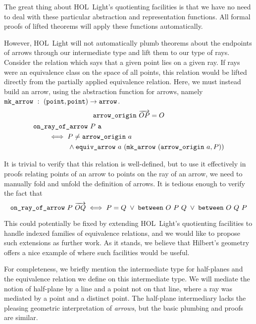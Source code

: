 The great thing about HOL~Light's quotienting facilities is that we have no need to deal with these particular abstraction and representation functions. All formal proofs of lifted theorems will apply these functions automatically. 

However, HOL~Light will not automatically plumb theorems about the endpoints of arrows through our intermediate type and lift them to our type of rays. Consider the relation which says that a given point lies on a given ray. If rays were an equivalence class on the space of all points, this relation would be lifted directly from the partially applied equivalence relation. Here, we must instead build an arrow, using the abstraction function for arrows, namely $\code{mk\_arrow}\ :\ (\code{point},\code{point})\rightarrow\code{arrow}$.
\begin{gather}
  \code{arrow\_origin}\ \overrightarrow{OP} = O\\
  \begin{split}
    &\code{on\_ray\_of\_arrow}\ P\ \code{a}\\
    &\qquad\iff P \neq \code{arrow\_origin}\ a\\
    &\qquad\qquad\quad\wedge \code{equiv\_arrow}\ a\ (\code{mk\_arrow}\ (\code{arrow\_origin}\ a, P))
  \end{split}
\end{gather}

It is trivial to verify that this relation is well-defined, but to use it effectively in proofs relating points of an arrow to points on the ray of an arrow, we need to manually fold and unfold the definition of arrows. It is tedious enough to verify the fact that
\begin{equation}
  \texttt{on\_ray\_of\_arrow}\ P\ \overrightarrow{OQ} \iff P = Q\;\vee\;\texttt{between}\ O\ P\ Q\;\vee\;\texttt{between}\ O\ Q\ P
\end{equation}

This could potentially be fixed by extending HOL~Light's quotienting facilities to handle indexed families of equivalence relations, and we would like to propose such extensions as further work. As it stands, we believe that Hilbert's geometry offers a nice example of where such facilities would be useful.

For completeness, we briefly mention the intermediate type for half-planes and the equivalence relation we define on this intermediate type. We will mediate the notion of half-plane by a line and a point not on that line, where a ray was mediated by a point and a distinct point. The half-plane intermediary lacks the pleasing geometric interpretation of \emph{arrows}, but the basic plumbing and proofs are similar. 

